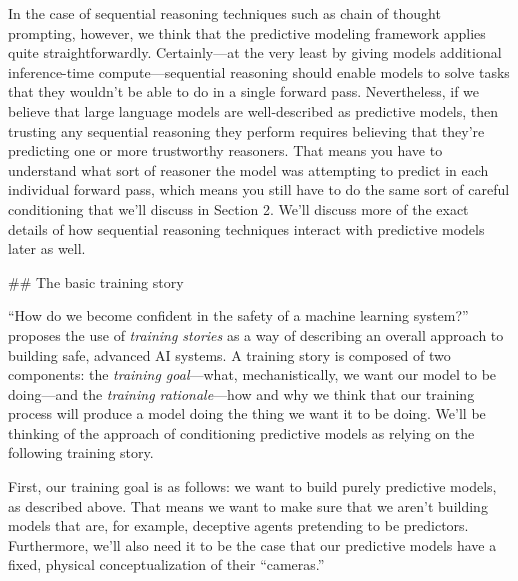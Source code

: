 {In the case of sequential reasoning techniques such as chain of thought prompting, however, we think that the predictive modeling framework applies quite straightforwardly. Certainly---at the very least by giving models additional inference-time compute---sequential reasoning should enable models to solve tasks that they wouldn't be able to do in a single forward pass. Nevertheless, if we believe that large language models are well-described as predictive models, then trusting any sequential reasoning they perform requires believing that they're predicting one or more trustworthy reasoners. That means you have to understand what sort of reasoner the model was attempting to predict in each individual forward pass, which means you still have to do the same sort of careful conditioning that we'll discuss in Section 2\cite{TODO: cite TODO}. We'll discuss more of the exact details of how sequential reasoning techniques interact with predictive models\cite{TODO: cite TODO} later as well.


## The basic training story

``How do we become confident in the safety of a machine learning system?\cite{TODO: cite https://www.alignmentforum.org/posts/FDJnZt8Ks2djouQTZ/how-do-we-become-confident-in-the-safety-of-a-machine}'' proposes the use of \textit{training stories} as a way of describing an overall approach to building safe, advanced AI systems. A training story is composed of two components: the \textit{training goal}---what, mechanistically, we want our model to be doing---and the \textit{training rationale}---how and why we think that our training process will produce a model doing the thing we want it to be doing. We'll be thinking of the approach of conditioning predictive models as relying on the following training story.

First, our training goal is as follows: we want to build purely predictive models, as described above. That means we want to make sure that we aren't building models that are, for example, deceptive agents\cite{TODO: cite https://www.alignmentforum.org/posts/A9NxPTwbw6r6Awuwt/how-likely-is-deceptive-alignment} pretending to be predictors. Furthermore, we'll also need it to be the case that our predictive models have a fixed, physical conceptualization of their ``cameras.''

}
